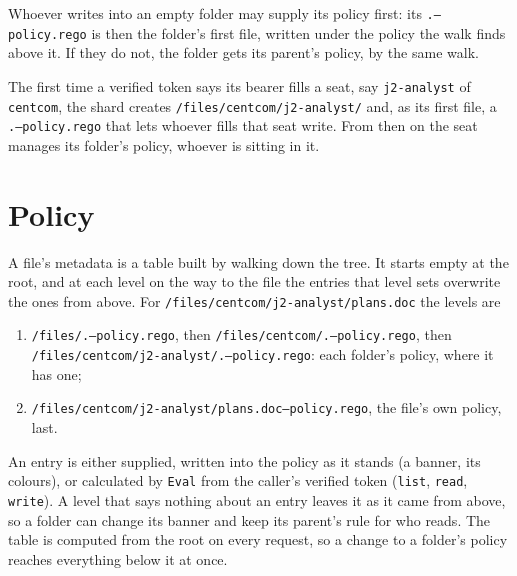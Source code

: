 \documentclass[11pt,oneside]{book}
\providecommand{\tightlist}{\setlength{\itemsep}{0pt}\setlength{\parskip}{0pt}}
\begin{document}
Whoever writes into an empty folder may supply its policy first: its
\texttt{.--policy.rego} is then the folder's first file, written under the policy
the walk finds above it. If they do not, the folder gets its parent's policy, by
the same walk.

The first time a verified token says its
bearer fills a seat, say \texttt{j2-analyst} of \texttt{centcom}, the shard
creates \texttt{/files/centcom/j2-analyst/} and, as its first file, a
\texttt{.--policy.rego} that lets whoever fills that seat write. From then on the
seat manages its folder's policy, whoever is sitting in it.

\section{Policy}
A file's metadata is a table built by walking down the tree. It starts empty
at the root, and at each level on the way to the file the entries that level sets
overwrite the ones from above. For \texttt{/files/centcom/j2-analyst/plans.doc}
the levels are
\begin{enumerate}\tightlist
\item \texttt{/files/.--policy.rego}, then \texttt{/files/centcom/.--policy.rego},
  then \texttt{/files/centcom/j2-analyst/.--policy.rego}: each folder's policy,
  where it has one;
\item \texttt{/files/centcom/j2-analyst/plans.doc--policy.rego}, the file's own
  policy, last.
\end{enumerate}
An entry is either supplied, written into the policy as it stands (a banner, its
colours), or calculated by \texttt{Eval} from the caller's verified token
(\texttt{list}, \texttt{read}, \texttt{write}). A level that says nothing about an entry leaves
it as it came from above, so a folder can change its banner and keep its parent's
rule for who reads. The table is computed from the root on every request, so a
change to a folder's policy reaches everything below it at once.
\end{document}
